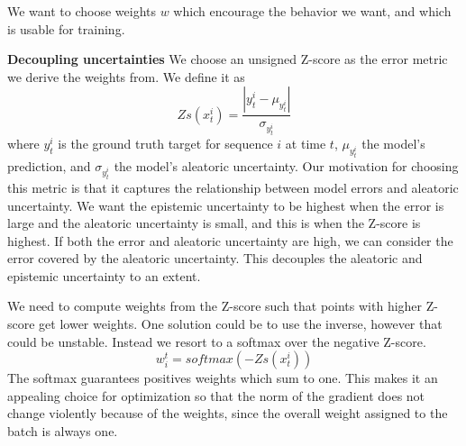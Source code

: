 \documentclass[../main.tex]{subfiles}
\begin{document}


We want to choose weights $w$ which encourage the behavior we want, and which is usable for training.  

\textbf{Decoupling uncertainties} We choose an unsigned Z-score as the error metric we derive the weights from. We define it as 
\begin{equation}
    Zs(x_t^i) = \frac{|y_t^i - \mu_{y_t^i}|}{\sigma_{y_t^i}}
\end{equation}{}
where $y_t^i$ is the ground truth target for sequence $i$ at time $t$, $\mu_{y_t^i}$ the model's prediction, and $\sigma_{y_t^i}$ the model's aleatoric uncertainty. Our motivation for choosing this metric is that it captures the relationship between model errors and aleatoric uncertainty. We want the epistemic uncertainty to be highest when the error is large and the aleatoric uncertainty is small, and this is when the Z-score is highest. If both the error and aleatoric uncertainty are high, we can consider the error covered by the aleatoric uncertainty. This decouples the aleatoric and epistemic uncertainty to an extent.

We need to compute weights from the Z-score such that points with higher Z-score get lower weights. One solution could be to use the inverse, however that could be unstable. Instead we resort to a softmax over the negative Z-score. 
$$
    w_i^t = softmax(-Zs(x_t^i))
$$
The softmax guarantees positives weights which sum to one. This makes it an appealing choice for optimization so that the norm of the gradient does not change violently because of the weights, since the overall weight assigned to the batch is always one. 
\end{document}
